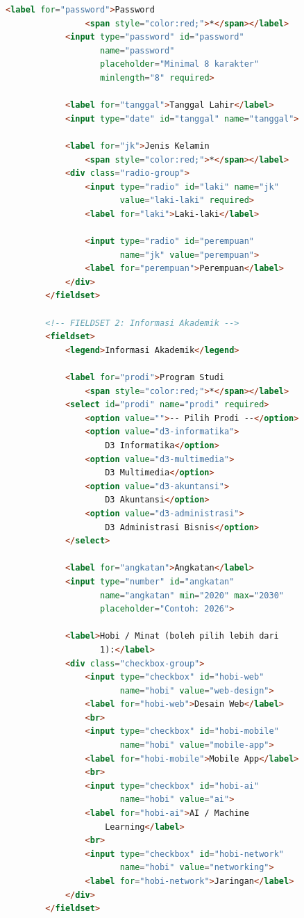 \begin{lstlisting}[language=HTML, caption={Form pendaftaran akun}, label={lst:m04-form}]
            <label for="password">Password
                <span style="color:red;">*</span></label>
            <input type="password" id="password"
                   name="password"
                   placeholder="Minimal 8 karakter"
                   minlength="8" required>

            <label for="tanggal">Tanggal Lahir</label>
            <input type="date" id="tanggal" name="tanggal">

            <label for="jk">Jenis Kelamin
                <span style="color:red;">*</span></label>
            <div class="radio-group">
                <input type="radio" id="laki" name="jk"
                       value="laki-laki" required>
                <label for="laki">Laki-laki</label>

                <input type="radio" id="perempuan"
                       name="jk" value="perempuan">
                <label for="perempuan">Perempuan</label>
            </div>
        </fieldset>

        <!-- FIELDSET 2: Informasi Akademik -->
        <fieldset>
            <legend>Informasi Akademik</legend>

            <label for="prodi">Program Studi
                <span style="color:red;">*</span></label>
            <select id="prodi" name="prodi" required>
                <option value="">-- Pilih Prodi --</option>
                <option value="d3-informatika">
                    D3 Informatika</option>
                <option value="d3-multimedia">
                    D3 Multimedia</option>
                <option value="d3-akuntansi">
                    D3 Akuntansi</option>
                <option value="d3-administrasi">
                    D3 Administrasi Bisnis</option>
            </select>

            <label for="angkatan">Angkatan</label>
            <input type="number" id="angkatan"
                   name="angkatan" min="2020" max="2030"
                   placeholder="Contoh: 2026">

            <label>Hobi / Minat (boleh pilih lebih dari
                   1):</label>
            <div class="checkbox-group">
                <input type="checkbox" id="hobi-web"
                       name="hobi" value="web-design">
                <label for="hobi-web">Desain Web</label>
                <br>
                <input type="checkbox" id="hobi-mobile"
                       name="hobi" value="mobile-app">
                <label for="hobi-mobile">Mobile App</label>
                <br>
                <input type="checkbox" id="hobi-ai"
                       name="hobi" value="ai">
                <label for="hobi-ai">AI / Machine
                    Learning</label>
                <br>
                <input type="checkbox" id="hobi-network"
                       name="hobi" value="networking">
                <label for="hobi-network">Jaringan</label>
            </div>
        </fieldset>


\end{lstlisting}

